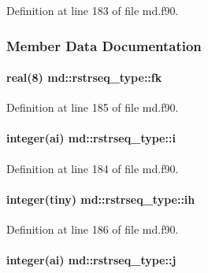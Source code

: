 Definition at line 183 of file md.\-f90.



\subsubsection{Member Data Documentation}
\hypertarget{structmd_1_1rstrseq__type_acbcd729f04b4e0aaa3ee41ff82fedda4}{
\paragraph[{fk}]{\setlength{\rightskip}{0pt plus 5cm}real(8) md\-::rstrseq\-\_\-type\-::fk}}\label{structmd_1_1rstrseq__type_acbcd729f04b4e0aaa3ee41ff82fedda4}


Definition at line 185 of file md.\-f90.

\hypertarget{structmd_1_1rstrseq__type_a65073d530d03fc7fcc43c4a9db6734a7}{
\paragraph[{i}]{\setlength{\rightskip}{0pt plus 5cm}integer(ai) md\-::rstrseq\-\_\-type\-::i}}\label{structmd_1_1rstrseq__type_a65073d530d03fc7fcc43c4a9db6734a7}


Definition at line 184 of file md.\-f90.

\hypertarget{structmd_1_1rstrseq__type_a7ca060dd7802b6a03c75994c0d0cc11f}{
\paragraph[{ih}]{\setlength{\rightskip}{0pt plus 5cm}integer(tiny) md\-::rstrseq\-\_\-type\-::ih}}\label{structmd_1_1rstrseq__type_a7ca060dd7802b6a03c75994c0d0cc11f}


Definition at line 186 of file md.\-f90.

\hypertarget{structmd_1_1rstrseq__type_a882d442463cff61992451257fd294604}{
\paragraph[{j}]{\setlength{\rightskip}{0pt plus 5cm}integer(ai) md\-::rstrseq\-\_\-type\-::j}}\label{structmd_1_1rstrseq__type_a882d442463cff61992451257fd294604}


